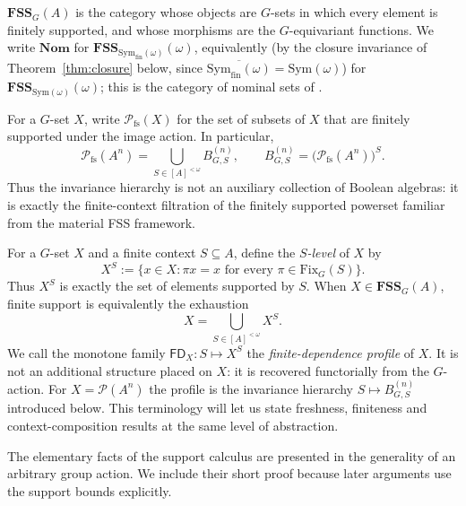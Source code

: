 \documentclass{lmcs}
\newcommand{\Sym}{\mathrm{Sym}}
\newcommand{\Symfin}{\mathrm{Sym}_{\mathrm{fin}}}
\newcommand{\Fix}{\mathrm{Fix}}
\newcommand{\fs}{\mathrm{fs}}
\newcommand{\Nom}{\mathbf{Nom}}
\newcommand{\FSS}{\mathbf{FSS}}
\newcommand{\Pfs}{\mathcal{P}_{\fs}}
\newcommand{\FD}{\mathsf{FD}}
\begin{document}
\begin{defi}\label{def:cat}
$\FSS_G(A)$ is the category whose objects are $G$-sets in which every
element is finitely supported, and whose morphisms are the
$G$-equivariant functions. We write $\Nom$ for
$\FSS_{\Symfin(\omega)}(\omega)$, equivalently (by the closure
invariance of Theorem~\ref{thm:closure} below, since
$\overline{\Symfin(\omega)}=\Sym(\omega)$) for
$\FSS_{\Sym(\omega)}(\omega)$; this is the category of nominal sets of \cite{Pitts13}.
\end{defi}

For a $G$-set $X$, write $\Pfs(X)$ for the set of subsets of $X$ that are
finitely supported under the image action. In particular,
\[
  \Pfs(A^n)
  =\bigcup_{S\in[A]^{<\omega}} B^{(n)}_{G,S},
  \qquad
  B^{(n)}_{G,S}=\bigl(\Pfs(A^n)\bigr)^S.
\]
Thus the invariance hierarchy is not an auxiliary collection of Boolean
algebras: it is exactly the finite-context filtration of the finitely
supported powerset familiar from the material FSS framework.

For a $G$-set $X$ and a finite context $S\subseteq A$, define the
\emph{$S$-level} of $X$ by
\[
   X^S:=\{x\in X: \pi x=x\text{ for every }\pi\in\Fix_G(S)\}.
\]
Thus $X^S$ is exactly the set of elements supported by $S$. When
$X\in\FSS_G(A)$, finite support is equivalently the exhaustion
\[
    X=\bigcup_{S\in[A]^{<\omega}}X^S.
\]
We call the monotone family $\FD_X:S\mapsto X^S$ the
\emph{finite-dependence profile} of $X$. It is not an additional
structure placed on $X$: it is recovered functorially from the $G$-action.
For $X=\mathcal P(A^n)$ the profile is the invariance hierarchy
$S\mapsto B^{(n)}_{G,S}$ introduced below. This terminology will let us
state freshness, finiteness and context-composition results at the same
level of abstraction.

The elementary facts of the support calculus are presented in the
generality of an arbitrary group action. We include their short proof
because later arguments use the support bounds explicitly.
\end{document}
